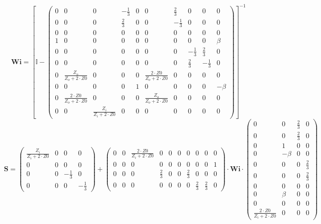 \[ \mathbf{Wi} =  \left[ \mathbb{I}  - \left(\begin{smallmatrix} 0 & 0 & 0 & -\frac{1}{3} & 0 & 0 & \frac{2}{3} & 0 & 0 & 0 \\ 0 & 0 & 0 & \frac{2}{3} & 0 & 0 & -\frac{1}{3} & 0 & 0 & 0 \\ 0 & 0 & 0 & 0 & 0 & 0 & 0 & 0 & 0 & 0 \\ 1 & 0 & 0 & 0 & 0 & 0 & 0 & 0 & 0 & \beta \\ 0 & 0 & 0 & 0 & 0 & 0 & 0 & -\frac{1}{3} & \frac{2}{3} & 0 \\ 0 & 0 & 0 & 0 & 0 & 0 & 0 & \frac{2}{3} & -\frac{1}{3} & 0 \\ 0 & \frac{Z_o}{Z_o+2\cdot Z0} & 0 & 0 & 0 & \frac{2\cdot Z0}{Z_o+2\cdot Z0} & 0 & 0 & 0 & 0 \\ 0 & 0 & 0 & 0 & 1 & 0 & 0 & 0 & 0 & -\beta \\ 0 & \frac{2\cdot Z0}{Z_o+2\cdot Z0} & 0 & 0 & 0 & \frac{Z_o}{Z_o+2\cdot Z0} & 0 & 0 & 0 & 0 \\ 0 & 0 & \frac{Z_i}{Z_i+2\cdot Z0} & 0 & 0 & 0 & 0 & 0 & 0 & 0 \end{smallmatrix}\right) \right]^{-1}  \]
\[ \mathbf{S} = \left(\begin{smallmatrix} \frac{Z_i}{Z_i+2\cdot Z0} & 0 & 0 & 0 \\ 0 & 0 & 0 & 0 \\ 0 & 0 & -\frac{1}{3} & 0 \\ 0 & 0 & 0 & -\frac{1}{3} \end{smallmatrix}\right) + \left(\begin{smallmatrix} 0 & 0 & \frac{2\cdot Z0}{Z_i+2\cdot Z0} & 0 & 0 & 0 & 0 & 0 & 0 & 0 \\ 0 & 0 & 0 & 0 & 0 & 0 & 0 & 0 & 0 & 1 \\ 0 & 0 & 0 & \frac{2}{3} & 0 & 0 & \frac{2}{3} & 0 & 0 & 0 \\ 0 & 0 & 0 & 0 & 0 & 0 & 0 & \frac{2}{3} & \frac{2}{3} & 0 \end{smallmatrix}\right) \cdot \mathbf{Wi} \cdot\left(\begin{smallmatrix} 0 & 0 & \frac{2}{3} & 0 \\ 0 & 0 & \frac{2}{3} & 0 \\ 0 & 1 & 0 & 0 \\ 0 & -\beta & 0 & 0 \\ 0 & 0 & 0 & \frac{2}{3} \\ 0 & 0 & 0 & \frac{2}{3} \\ 0 & 0 & 0 & 0 \\ 0 & \beta & 0 & 0 \\ 0 & 0 & 0 & 0 \\ \frac{2\cdot Z0}{Z_i+2\cdot Z0} & 0 & 0 & 0 \end{smallmatrix}\right) \]
